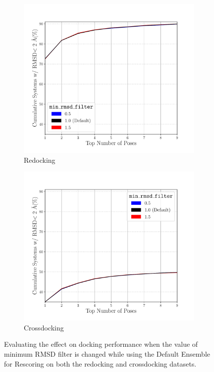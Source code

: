 \documentclass[journal=jcisd8,manuscript=article]{achemso}
\begin{document}
\begin{figure}    
        \begin{subfigure}[b]{0.48\textwidth}    
		\centering
		\includegraphics[width=\textwidth]{figures/redocking/sweep_rmsdf_line.pdf}
		\caption{Redocking}
		\label{fig:RMSDFilterRedock}
        \end{subfigure}    
        \begin{subfigure}[b]{0.48\textwidth}    
		\centering
		\includegraphics[width=\textwidth]{figures/crossdocking/sweep_rmsdf_line.pdf}
		\caption{Crossdocking}
		\label{fig:RMSDFilterCrossdock}
        \end{subfigure}    
	\caption{Evaluating the effect on docking performance when the value of minimum RMSD filter is changed while using the Default Ensemble for Rescoring on both the redocking and crossdocking datasets.}
	\label{fig:RMSDFilter}
\end{figure}  
\end{document}
